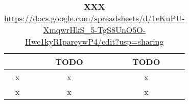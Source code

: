 \begin{table}
\centering
\caption[XXX]{\textbf{XXX} \url{https://docs.google.com/spreadsheets/d/1eKuPU-XmqwrHkS_5-TgS8UnO5O-Hwe1kyRIpareywP4/edit?usp=sharing}}
\label{tab:studies}
\vspace*{5mm}
\begin{tabular}{ccc}
	\toprule
	{}  & TODO & TODO \\
	\midrule

	x & x & x\\
	x & x & x\\
	\bottomrule
\end{tabular}
\end{table}